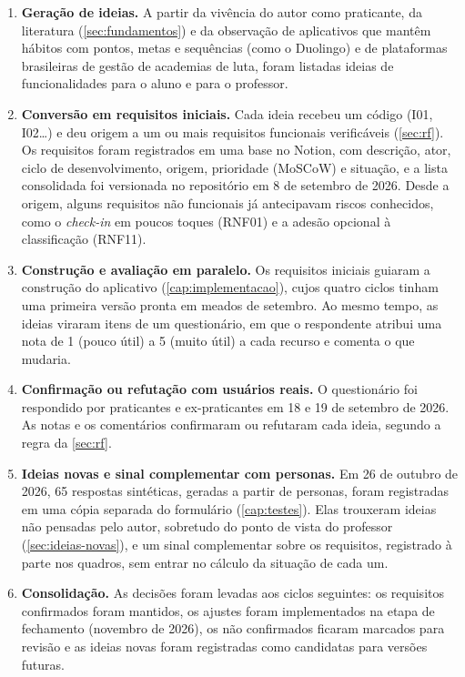 \begin{enumerate}
  \item \textbf{Geração de ideias.} A partir da vivência do autor como
        praticante, da literatura
        (\autoref{sec:fundamentos}) e da observação de aplicativos que
        mantêm hábitos com pontos, metas e sequências (como o Duolingo) e
        de plataformas brasileiras de gestão de academias de luta, foram
        listadas ideias de funcionalidades para o aluno e para o
        professor.
  \item \textbf{Conversão em requisitos iniciais.} Cada ideia recebeu um
        código (I01, I02\ldots) e deu origem a um ou mais requisitos
        funcionais verificáveis (\autoref{sec:rf}). Os requisitos foram
        registrados em uma base no Notion, com descrição, ator, ciclo de
        desenvolvimento, origem, prioridade (MoSCoW) e situação, e a lista
        consolidada foi versionada no repositório em 8 de setembro de 2026.
        Desde a origem, alguns requisitos não funcionais já antecipavam
        riscos conhecidos, como o \textit{check-in} em poucos toques
        (RNF01) e a adesão opcional à classificação (RNF11).
  \item \textbf{Construção e avaliação em paralelo.} Os requisitos
        iniciais guiaram a construção do aplicativo
        (\autoref{cap:implementacao}), cujos quatro ciclos tinham uma
        primeira versão pronta em meados de setembro. Ao mesmo tempo, as
        ideias viraram itens de um questionário, em que o respondente
        atribui uma nota de 1 (pouco útil) a 5 (muito útil) a cada recurso
        e comenta o que mudaria.
  \item \textbf{Confirmação ou refutação com usuários reais.} O
        questionário foi respondido por praticantes e ex-praticantes em 18
        e 19 de setembro de 2026. As notas e os comentários confirmaram ou
        refutaram cada ideia, segundo a regra da \autoref{sec:rf}.
  \item \textbf{Ideias novas e sinal complementar com personas.} Em 26
        de outubro de 2026, 65 respostas sintéticas, geradas a partir de
        personas, foram registradas em uma cópia separada do formulário
        (\autoref{cap:testes}). Elas trouxeram ideias não pensadas pelo
        autor, sobretudo do ponto de vista do professor
        (\autoref{sec:ideias-novas}), e um sinal complementar sobre os
        requisitos, registrado à parte nos quadros, sem entrar no
        cálculo da situação de cada um.
  \item \textbf{Consolidação.} As decisões foram levadas aos ciclos
        seguintes: os requisitos confirmados foram mantidos, os ajustes
        foram implementados na etapa de fechamento (novembro de 2026), os
        não confirmados ficaram marcados para revisão e as ideias novas
        foram registradas como candidatas para versões futuras.
\end{enumerate}

